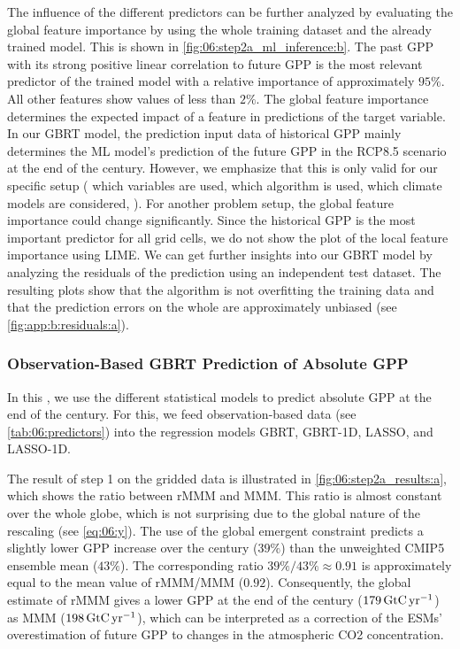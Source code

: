 The influence of the different predictors can be further analyzed by evaluating
the global feature importance by using the whole training dataset and the
already trained model. This is shown in \cref{fig:06:step2a_ml_inference:b}.
The past \ac{GPP} with its strong positive linear correlation to future
\ac{GPP} is the most relevant predictor of the trained model with a relative
importance of approximately $95 \unit{\%}$. All other features show values of
less than $2 \unit{\%}$. The global feature importance determines the expected
impact of a feature in predictions of the target variable. In our \ac{GBRT}
model, the prediction input data of historical \ac{GPP} mainly determines the
\ac{ML} model's prediction of the future \ac{GPP} in the \acs{RCP}8.5 scenario
at the end of the  century. However, we emphasize that this is only
valid for our specific setup (\ie{} which variables are used, which algorithm
is used, which climate models are considered, \etc{}). For another problem
setup, the global feature importance could change significantly. Since the
historical \ac{GPP} is the most important predictor for all grid cells, we do
not show the plot of the local feature importance using \ac{LIME}. We can get
further insights into our \ac{GBRT} model by analyzing the residuals of the
prediction using an independent test dataset. The resulting plots show that the
algorithm is not overfitting the training data and that the prediction errors
on the whole are approximately unbiased (see \cref{fig:app:b:residuals:a}).


\subsubsection{Observation-Based \acs{GBRT} Prediction of Absolute \acs{GPP}}
\label{subsubsec:06:results_step2a_obs}

In this , we use the different
statistical models to predict absolute \ac{GPP} at the end of the 
century. For this, we feed observation-based data (see
\cref{tab:06:predictors}) into the regression models \ac{GBRT}, \acs{GBRT}-1D,
\ac{LASSO}, and \acs{LASSO}-1D.

The result of step 1 on the gridded data is illustrated in
\cref{fig:06:step2a_results:a}, which shows the ratio between r\acs{MMM} and
\ac{MMM}. This ratio is almost constant over the whole globe, which is not
surprising due to the global nature of the rescaling (see \cref{eq:06:y}). The
use of the global emergent constraint predicts a slightly lower \ac{GPP}
increase over the  century ($39 \unit{\%}$) than the unweighted
\acs{CMIP}5 ensemble mean ($43 \unit{\%}$). The corresponding ratio $39
\unit{\%} / 43 \unit{\%} \approx 0.91$ is approximately equal to the mean value
of r\acs{MMM}/\acs{MMM} ($0.92$). Consequently, the global estimate of
r\acs{MMM} gives a lower \ac{GPP} at the end of the century ($179
\unit{\GtCyr{}}$) as \ac{MMM} ($198 \unit{\GtCyr{}}$), which can be
interpreted as a correction of the \acp{ESM}' overestimation of future \ac{GPP}
to changes in the atmospheric \ac{CO2} concentration.

